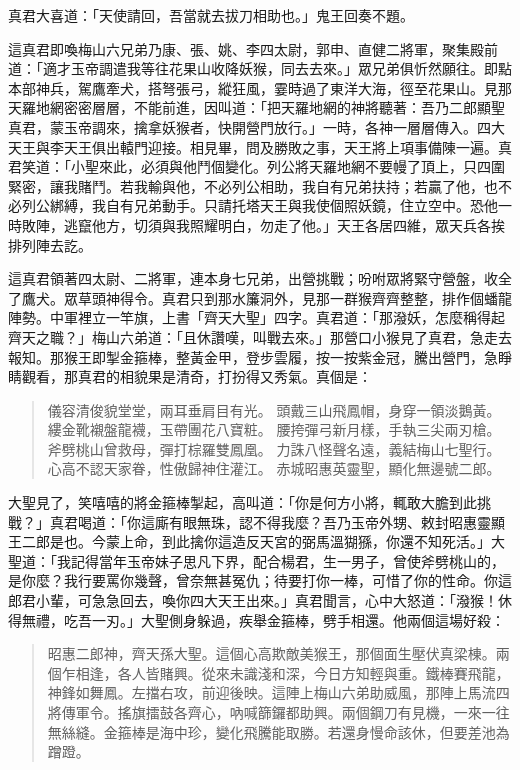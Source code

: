 真君大喜道：「天使請回，吾當就去拔刀相助也。」鬼王回奏不題。

這真君即喚梅山六兄弟乃康、張、姚、李四太尉，郭申、直健二將軍，聚集殿前道：「適才玉帝調遣我等往花果山收降妖猴，同去去來。」眾兄弟俱忻然願往。即點本部神兵，駕鷹牽犬，搭弩張弓，縱狂風，霎時過了東洋大海，徑至花果山。見那天羅地網密密層層，不能前進，因叫道：「把天羅地網的神將聽著：吾乃二郎顯聖真君，蒙玉帝調來，擒拿妖猴者，快開營門放行。」一時，各神一層層傳入。四大天王與李天王俱出轅門迎接。相見畢，問及勝敗之事，天王將上項事備陳一遍。真君笑道：「小聖來此，必須與他鬥個變化。列公將天羅地網不要幔了頂上，只四圍緊密，讓我賭鬥。若我輸與他，不必列公相助，我自有兄弟扶持；若贏了他，也不必列公綁縛，我自有兄弟動手。只請托塔天王與我使個照妖鏡，住立空中。恐他一時敗陣，逃竄他方，切須與我照耀明白，勿走了他。」天王各居四維，眾天兵各挨排列陣去訖。

這真君領著四太尉、二將軍，連本身七兄弟，出營挑戰；吩咐眾將緊守營盤，收全了鷹犬。眾草頭神得令。真君只到那水簾洞外，見那一群猴齊齊整整，排作個蟠龍陣勢。中軍裡立一竿旗，上書「齊天大聖」四字。真君道：「那潑妖，怎麼稱得起齊天之職？」梅山六弟道：「且休讚嘆，叫戰去來。」那營口小猴見了真君，急走去報知。那猴王即掣金箍棒，整黃金甲，登步雲履，按一按紫金冠，騰出營門，急睜睛觀看，那真君的相貌果是清奇，打扮得又秀氣。真個是：
\begin{quote}
儀容清俊貌堂堂，兩耳垂肩目有光。
頭戴三山飛鳳帽，身穿一領淡鵝黃。
縷金靴襯盤龍襪，玉帶團花八寶粧。
腰挎彈弓新月樣，手執三尖兩刃槍。
斧劈桃山曾救母，彈打棕羅雙鳳凰。
力誅八怪聲名遠，義結梅山七聖行。
心高不認天家眷，性傲歸神住灌江。
赤城昭惠英靈聖，顯化無邊號二郎。
\end{quote}

大聖見了，笑嘻嘻的將金箍棒掣起，高叫道：「你是何方小將，輒敢大膽到此挑戰？」真君喝道：「你這廝有眼無珠，認不得我麼？吾乃玉帝外甥、敕封昭惠靈顯王二郎是也。今蒙上命，到此擒你這造反天宮的弼馬溫猢猻，你還不知死活。」大聖道：「我記得當年玉帝妹子思凡下界，配合楊君，生一男子，曾使斧劈桃山的，是你麼？我行要罵你幾聲，曾奈無甚冤仇；待要打你一棒，可惜了你的性命。你這郎君小輩，可急急回去，喚你四大天王出來。」真君聞言，心中大怒道：「潑猴！休得無禮，吃吾一刃。」大聖側身躲過，疾舉金箍棒，劈手相還。他兩個這場好殺：
\begin{quote}
昭惠二郎神，齊天孫大聖。這個心高欺敵美猴王，那個面生壓伏真梁棟。兩個乍相逢，各人皆賭興。從來未識淺和深，今日方知輕與重。鐵棒賽飛龍，神鋒如舞鳳。左擋右攻，前迎後映。這陣上梅山六弟助威風，那陣上馬流四將傳軍令。搖旗擂鼓各齊心，吶喊篩鑼都助興。兩個鋼刀有見機，一來一往無絲縫。金箍棒是海中珍，變化飛騰能取勝。若還身慢命該休，但要差池為蹭蹬。
\end{quote}

